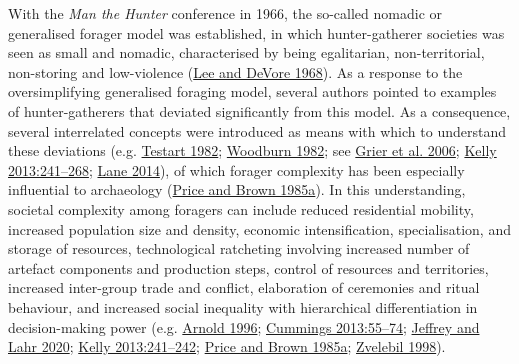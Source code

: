 \documentclass[
  12pt,
  a4paper,
  oneside]{book}
\begin{document}
With the \emph{Man the Hunter} conference in 1966, the so-called nomadic or generalised forager model was established, in which hunter-gatherer societies was seen as small and nomadic, characterised by being egalitarian, non-territorial, non-storing and low-violence (\protect\hyperlink{ref-lee1968}{Lee and DeVore 1968}). As a response to the oversimplifying generalised foraging model, several authors pointed to examples of hunter-gatherers that deviated significantly from this model. As a consequence, several interrelated concepts were introduced as means with which to understand these deviations (e.g. \protect\hyperlink{ref-testart1982}{Testart 1982}; \protect\hyperlink{ref-woodburn1982}{Woodburn 1982}; see \protect\hyperlink{ref-grier2006}{Grier et al. 2006}; \protect\hyperlink{ref-kelly2013}{Kelly 2013:241--268}; \protect\hyperlink{ref-lane2014}{Lane 2014}), of which forager complexity has been especially influential to archaeology (\protect\hyperlink{ref-price1985}{Price and Brown 1985a}). In this understanding, societal complexity among foragers can include reduced residential mobility, increased population size and density, economic intensification, specialisation, and storage of resources, technological ratcheting involving increased number of artefact components and production steps, control of resources and territories, increased inter-group trade and conflict, elaboration of ceremonies and ritual behaviour, and increased social inequality with hierarchical differentiation in decision-making power (e.g. \protect\hyperlink{ref-arnold1996}{Arnold 1996}; \protect\hyperlink{ref-cummings2013}{Cummings 2013:55--74}; \protect\hyperlink{ref-jeffery2020}{Jeffrey and Lahr 2020}; \protect\hyperlink{ref-kelly2013}{Kelly 2013:241--242}; \protect\hyperlink{ref-price1985}{Price and Brown 1985a}; \protect\hyperlink{ref-zvelebil1998}{Zvelebil 1998}).
\end{document}

